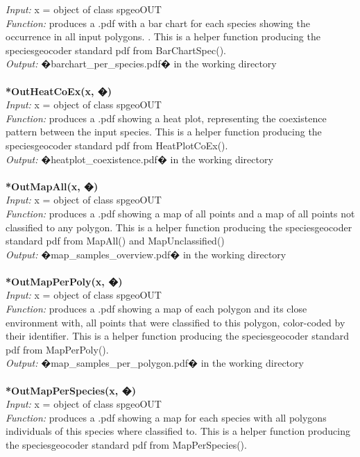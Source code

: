 \documentclass[a4paper,titlepage,11pt]{scrreprt}
\begin{document}
\textit{Input:} x = object of class spgeoOUT\\
\textit{Function:} produces a .pdf with a bar chart for each species showing the occurrence in all input polygons. . This is a helper function producing the speciesgeocoder standard pdf from BarChartSpec().\\
\textit{Output:} �barchart\_per\_species.pdf� in the working directory\\
\\
\textbf{*OutHeatCoEx(x, �)}\\
\textit{Input:} x = object of class spgeoOUT\\
\textit{Function:} produces a .pdf showing a heat plot, representing the coexistence pattern between the input species. This is a helper function producing the speciesgeocoder standard pdf from HeatPlotCoEx().\\
\textit{Output:} �heatplot\_coexistence.pdf� in the working directory\\
\\
\textbf{*OutMapAll(x, �)}\\
\textit{Input:} x = object of class spgeoOUT\\
\textit{Function:} produces a .pdf showing a map of all points and a map of all points not classified to any polygon. This is a helper function producing the speciesgeocoder standard pdf from MapAll() and MapUnclassified()\\
\textit{Output:} �map\_samples\_overview.pdf� in the working directory\\
\\
\textbf{*OutMapPerPoly(x, �)}\\
\textit{Input:} x = object of class spgeoOUT\\
\textit{Function:} produces a .pdf showing a map of each polygon and its close environment with, all points that were classified to this polygon, color-coded by their identifier. This is a helper function producing the speciesgeocoder standard pdf from MapPerPoly().\\
\textit{Output:} �map\_samples\_per\_polygon.pdf� in the working directory\\
\\
\textbf{*OutMapPerSpecies(x, �)}\\
\textit{Input:} x = object of class spgeoOUT\\
\textit{Function:} produces a .pdf showing a map for each species with all polygons individuals of this species where classified to. This is a helper function producing the speciesgeocoder standard pdf from MapPerSpecies().\\
\end{document}
